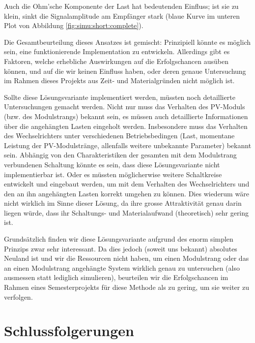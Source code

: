 Auch die  Ohm'sche Komponente der  Last hat  bedeutenden Einfluss; ist  sie zu
klein, sinkt die Signalamplitude am  Empf\"anger stark (blaue Kurve im unteren
Plot von Abbildung \ref{fig:simu:short:complete}).

Die Gesamtbeurteilung  dieses Ansatzes  ist gemischt: Prinzipiell  k\"onnte es
m\"oglich sein, eine  funktionierende Implementation zu entwickeln. Allerdings
gibt  es  Faktoren,  welche  erhebliche Auswirkungen  auf  die  Erfolgschancen
aus\"uben k\"onnen, und  auf die wir keinen Einfluss haben,  oder deren genaue
Untersuchung im Rahmen  dieses Projekts aus Zeit-  und Materialgr\"unden nicht
m\"oglich ist.

Sollte   diese   L\"osungsvariante   implementiert  werden,   m\"ussten   noch
detaillierte Untersuchungen  gemacht werden. Nicht nur muss  das Verhalten des
PV-Moduls (bzw. des Modulstrangs) bekannt  sein, es m\"ussen auch detaillierte
Informationen \"uber die angeh\"angten  Lasten eingeholt werden.  Insbesondere
muss das  Verhalten des  Wechselrichters unter  verschiedenen Betriebsbedingen
(Last, momentane Leistung der PV-Modulstr\"ange, allenfalls weitere unbekannte
Parameter)  bekannt sein. Abh\"angig  von  den  Charakteristiken der  gesamten
mit  dem  Modulstrang  verbundenen  Schaltung k\"onnte  es  sein,  dass  diese
L\"osungsvariante nicht implementierbar ist. Oder es m\"ussten m\"oglicherwise
weitere Schaltkreise entwickelt und eingebaut werden, um mit dem Verhalten des
Wechselrichters  und  den  an  ihn angeh\"angten  Lasten  korrekt  umgehen  zu
k\"onnen. Dies wiederum  w\"are nicht  wirklich im  Sinne dieser  L\"osung, da
ihre grosse Attraktivit\"at  genau darin liegen w\"urde,  dass ihr Schaltungs-
und Materialaufwand (theoretisch) sehr gering ist.

Grunds\"atzlich finden wir diese  L\"osungsvariante aufgrund des enorm simplen
Prinzips zwar sehr interessant. Da dies  jedoch (soweit uns bekannt) absolutes
Neuland ist und wir die Ressourcen  nicht haben, um einen Modulstrang oder das
an einen Modulstrang  angeh\"angte System wirklich genau  zu untersuchen (also
ausmessen statt  lediglich simulieren),  beurteilen wir die  Erfolgschancen im
Rahmen eines Semesterprojekts f\"ur diese Methode als zu gering, um sie weiter
zu verfolgen.


\clearpage
\section{Schlussfolgerungen}
\label{subsec:simu:conclusion}

